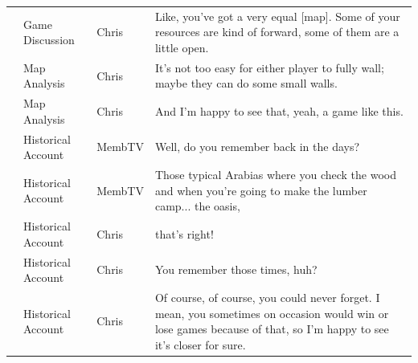 {\begin{longtable}{@{}>{\theAppRow}r|L{2.3cm}L{1.0cm}U{11.55cm}@{}}
    & Game Discussion      & Chris        & Like, you've got a very equal {[}map{]}. Some of your resources are kind of forward, some of them are a little open.                                                                                                                                             \\
    & Map Analysis          & Chris        & It's not too easy for either player to fully wall; maybe they can do some small walls.                                                                                                                                                                           \\
    & Map Analysis          & Chris        & And I'm happy to see that, yeah, a game like this.                                                                                                                                                                                                               \\
    & Historical Account    & MembTV       & Well, do you remember back in the days?                                                                                                                                                                                                                          \\
    & Historical Account    & MembTV       & Those typical Arabias where you check the wood and when you're going to make the lumber camp... the oasis,                                                                                                                                                       \\
    & Historical Account    & Chris        & that's right!                                                                                                                                                                                                                                                    \\
    & Historical Account    & Chris        & You remember those times, huh?                                                                                                                                                                                                                                   \\
    & Historical Account    & Chris        & Of course, of course, you could never forget. I mean, you sometimes on occasion would win or lose games because of that, so I'm happy to see it's closer for sure.                                                                                               \\

\end{longtable}}
